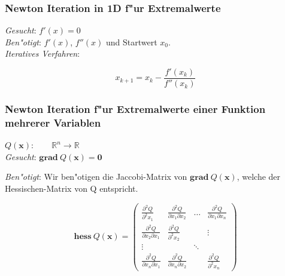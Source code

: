 \documentclass[german, 10pt, a4paper, twocolumn]{scrartcl}
\begin{document}
\subsubsection{Newton Iteration in 1D f"ur Extremalwerte}


\textit{Gesucht}: $f'(x)=0$\\

\textit{Ben"otigt}: $f'(x)$, $f''(x)$ und Startwert $x_0$.\\

\textit{Iteratives Verfahren}:

\begin{displaymath}
	x_{k+1} = x_k - \frac{f'(x_k)}{f''(x_k)}
\end{displaymath}

\subsubsection{Newton Iteration f"ur Extremalwerte einer Funktion mehrerer Variablen}


$Q(\mathbf{x}):\qquad \mathbb{R}^n\to\mathbb{R}$\\

\textit{Gesucht}: $\mathbf{grad}\:Q(\mathbf{x})=\mathbf{0}$\\


\textit{Ben"otigt}: Wir ben"otigen die Jaccobi-Matrix von $\mathbf{grad}\:Q(\mathbf{x})$, welche der Hessischen-Matrix von Q entspricht.

\begin{displaymath}
	\mathbf{hess}\: Q(\mathbf{x})=
	\left (
		\begin{array}{cccc}
			\frac{\partial^2 Q}{\partial^2 x_1} &	\frac{\partial^2 Q}{\partial x_1 \partial x_2} &	\hdots &	\frac{\partial^2 Q}{\partial x_1 \partial x_n} \\
			\frac{\partial^2 Q}{\partial x_2 \partial x_1} &	\frac{\partial^2 Q}{\partial ^2 x_2} &	&	\vdots\\
			\vdots &	&	\ddots \\
			\frac{\partial^2 Q}{\partial x_n \partial x_1} &	\frac{\partial^2 Q}{\partial x_n \partial x_2} &	&	\frac{\partial^2 Q}{\partial^2 x_n}
		\end{array}
	\right )
\end{displaymath}
\end{document}
